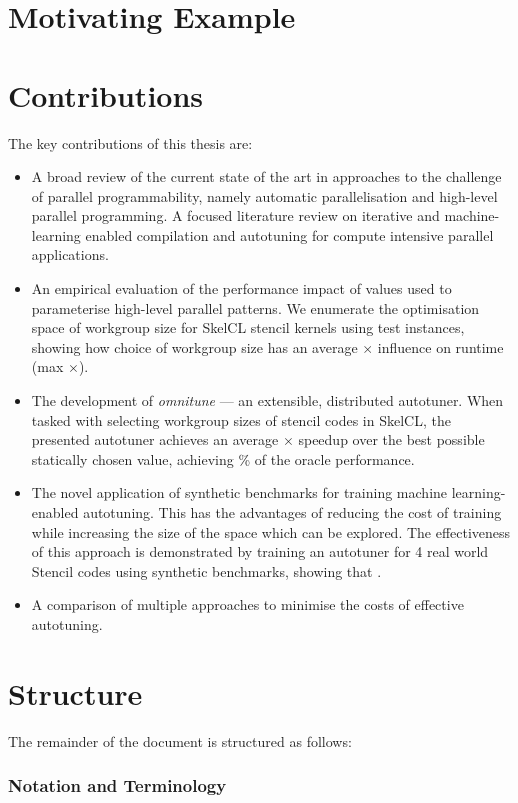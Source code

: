 

\section{Motivating Example}



\section{Contributions}

The key contributions of this thesis are:

\begin{itemize}
\item A broad review of the current state of the art in approaches to
  the challenge of parallel programmability, namely automatic
  parallelisation and high-level parallel programming. A focused
  literature review on iterative and machine-learning enabled
  compilation and autotuning for compute intensive parallel
  applications.
\item An empirical evaluation of the performance impact of values used
  to parameterise high-level parallel patterns. We enumerate the
  optimisation space of workgroup size for SkelCL stencil kernels
  using  test instances, showing how choice of workgroup
  size has an average $\times$ influence on runtime (max
  $\times$).
\item The development of \emph{omnitune} --- an extensible,
  distributed autotuner. When tasked with selecting workgroup sizes of
  stencil codes in SkelCL, the presented autotuner achieves an average
  $\times$ speedup over the best possible statically chosen
  value, achieving \% of the oracle performance.
\item The novel application of synthetic  benchmarks for training machine learning-enabled
  autotuning. This has the advantages of reducing the cost of training
  while increasing the size of the space which can be explored. The
  effectiveness of this approach is demonstrated by training an
  autotuner for 4 real world Stencil codes using synthetic benchmarks,
  showing that .
\item A comparison of multiple approaches to minimise the costs of
  effective autotuning. 
\end{itemize}

\section{Structure}

The remainder of the document is structured as follows:
\fixme{\ldots}

\subsubsection{Notation and Terminology}

